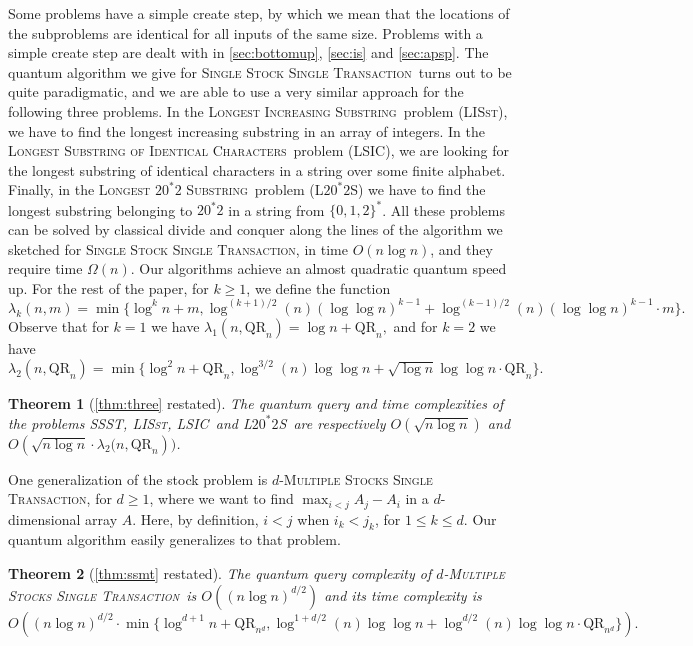 \documentclass[12pt]{article}
\newcommand{\qr}{\mathrm{QR}}
\newcommand{\SSSTf}{\textsc{Single Stock Single Transaction}}
\newcommand{\SSST}{\textsc{SSST}}
\newcommand{\LSICf}{\textsc{Longest Substring of Identical Characters}}
\newcommand{\LSIC}{\textsc{LSIC}}
\newcommand{\LISstf}{\textsc{Longest Increasing Substring}}
\newcommand{\LISst}{\textsc{LISst}}
\newcommand{\LZSf}{\textsc{Longest} $20^*2$ \textsc{Substring}}
\newcommand{\LZS}{\textsc{L}$20^*2$\textsc{S}}
\newcommand{\MSSTf}{\textsc{Multiple Stocks Single Transaction}}
\newtheorem*{rtheorem}{Theorem}
\theoremstyle{definition}
\begin{document}
Some problems have a simple create step, by which we mean that the locations of the subproblems are identical for all inputs of the same size. 
Problems with a simple create step are dealt with in \cref{sec:bottomup}, \cref{sec:is} and \cref{sec:apsp}.
The quantum algorithm we give for \SSSTf \ turns out to be quite paradigmatic, and we are able to use a very similar approach for 
the following three problems. 
In the \LISstf \ problem (\LISst), we have to find the longest increasing substring in an array of integers.
In the \LSICf \ problem (\LSIC), we are looking for the longest substring of identical characters in 
a string over some finite alphabet. 
Finally, 
in the \LZSf \ problem (\LZS) we have to find the longest substring belonging to $20^*2$ in a string
from $\{0,1,2\}^*$.
All these problems 
can be solved by classical divide and conquer along the lines of the algorithm we sketched for \SSSTf, 
in time  $O(n \log n)$, and they require time $\Omega(n)$.
Our algorithms achieve an almost quadratic quantum speed up.  For the rest of the paper, for $k \geq 1$, we define the function 
\[
\lambda_k (n, m) = \min \{\log^k n + m , \log^{(k+1)/2} (n) (\log \log n)^{k-1} + \log^{(k-1)/2} (n) (\log \log n)^{k-1} \cdot m \}.
\]
Observe that for $k=1$ we have $\lambda_1 (n, \qr_n) =  \log n + \qr_n,$ and for 
$k=2$ we have $\lambda_2 (n, \qr_n) = \min \{\log^2 n+ \qr_n , \log^{3/2} (n) \log \log n + \sqrt{\log n} \log \log n \cdot \qr_n \}.$


\begin{rtheorem}[\cref{thm:three} {\normalfont restated}]
The quantum query and time complexities of the problems \SSST, \LISst, \LSIC \ and \LZS \ 
are respectively $O(\sqrt{n \log n})$ and 
$O({\sqrt{n \log n} \cdot \lambda_2 (n, \qr_n}))$.
\end{rtheorem}
 
One generalization of the stock problem is $d$-\MSSTf, for $d \geq 1$,  where we want to 
find $\max_{i < j} A_j - A_i$ in a
$d$-dimensional array $A$. Here, by definition, $i<j$ when $i_k < j_k$, for $1 \leq k \leq d.$
Our quantum algorithm easily generalizes to that problem.

\begin{rtheorem}[\cref{thm:ssmt} {\normalfont restated}]
The quantum query complexity of $d$-\MSSTf \ is
$O( (n \log n)^{d/2})$ and
its time complexity is
\[
O \left ((n \log n)^{d/2} \cdot \min \{\log^{d+1} n + \qr_{n^d} , \log^{1 + d/2} (n) \log \log n + \log^{d/2} (n) \log \log n \cdot \qr_{n^d} \} \right).
\]
\end{rtheorem}
\end{document}
